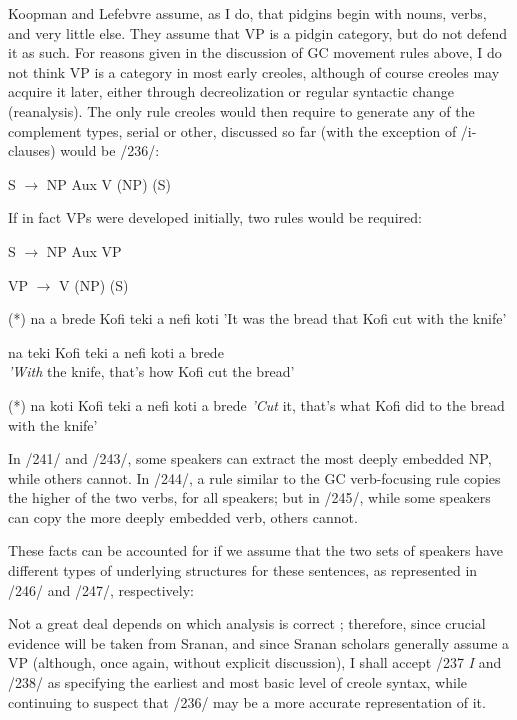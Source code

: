 Koopman and Lefebvre assume, as I do, that pidgins begin with
nouns, verbs, and very little else. They assume that VP is a pidgin category, but do not defend it as such. For reasons given in the discussion of GC movement rules above, I do not think VP is a category in most early creoles, although of course creoles may acquire it later, either through decreolization or regular syntactic change (reanalysis). The only rule creoles would then require to generate any of the comple\-ment types, serial or other, discussed so far (with the exception of
/i-clauses) would be /236/:

\ea\label{ex:236}
 S {$\to$} NP Aux V (NP) (S)
\z

If in fact VPs were developed initially, two rules would be required:

\ea\label{ex:237}
S {$\to$} NP Aux VP
\z

\ea\label{ex:238}
 VP {$\to$} V (NP) (S)
\z


\ea\label{ex:243}
 (*) na a brede Kofi teki a nefi koti
\glt 'It was the bread that Kofi cut with the knife'
\z


\ea\label{ex:244}
na teki Kofi teki a nefi koti a brede\\
\glt \textit{'With} the knife, that's how Kofi cut the bread'
\z

\ea\label{ex:245}
 (*) na koti Kofi teki a nefi koti a brede
\glt \textit{'Cut} it, that's what Kofi did to the bread with the knife'
\z



In /241/ and /243/, some speakers can extract the most deeply embed\-ded NP, while others cannot. In /244/, a rule similar to the GC verb-focusing rule copies the higher of the two verbs, for all speakers; but in /245/, while some speakers can copy the more deeply embedded verb, others cannot.

These facts can be accounted for if we assume that the two sets of speakers have different types of underlying structures for these sentences, as represented in /246/ and /247/, respectively:

Not a great deal depends on which analysis is correct ; therefore, since crucial evidence will be taken from Sranan, and since Sranan scholars generally assume a VP (although, once again, without explicit discussion), I shall accept /237 \textit{I} and /238/ as specifying the earliest and most basic level of creole syntax, while continuing to suspect that
/236/ may be a more accurate representation of it.

